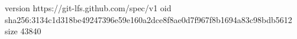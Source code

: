 version https://git-lfs.github.com/spec/v1
oid sha256:3134c1d318be49247396e59e160a2dce8f8ae0d7f967f8b1694a83c98bdb5612
size 43840
